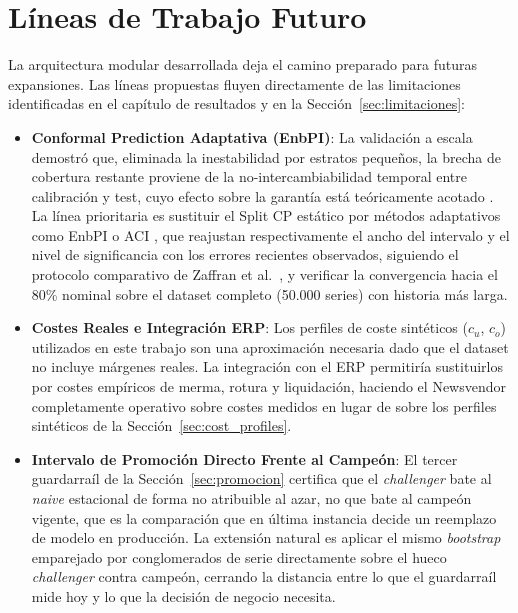 \section{Líneas de Trabajo Futuro}
\label{sec:trabajo_futuro}
La arquitectura modular desarrollada deja el camino preparado para futuras expansiones. Las líneas propuestas fluyen directamente de las limitaciones identificadas en el capítulo de resultados y en la Sección~\ref{sec:limitaciones}:

\begin{itemize}
    \item \textbf{Conformal Prediction Adaptativa (EnbPI)}: La validación a escala demostró que,
    eliminada la inestabilidad por estratos pequeños, la brecha de cobertura restante proviene de la
    no-intercambiabilidad temporal entre calibración y test, cuyo efecto sobre la garantía está
    teóricamente acotado \cite{barber2023beyond}. La línea prioritaria es sustituir el
    Split CP estático por métodos adaptativos como EnbPI \cite{xu2021conformal} o ACI
    \cite{gibbs2021adaptive}, que reajustan respectivamente el ancho del intervalo y el nivel de
    significancia con los errores recientes observados, siguiendo el protocolo comparativo de
    Zaffran et al.\ \cite{zaffran2022adaptive}, y verificar la convergencia hacia el
    80\% nominal sobre el dataset completo (50.000 series) con historia más larga.

    \item \textbf{Costes Reales e Integración ERP}: Los perfiles de coste sintéticos ($c_u$, $c_o$)
    utilizados en este trabajo son una aproximación necesaria dado que el dataset no incluye
    márgenes reales. La integración con el ERP permitiría sustituirlos por costes empíricos de
    merma, rotura y liquidación, haciendo el Newsvendor completamente operativo sobre costes
    medidos en lugar de sobre los perfiles sintéticos de la Sección~\ref{sec:cost_profiles}.

    \item \textbf{Intervalo de Promoción Directo Frente al Campeón}: El tercer guardarraíl
    de la Sección~\ref{sec:promocion} certifica que el \textit{challenger} bate al \textit{naive}
    estacional de forma no atribuible al azar, no que bate al campeón vigente, que es la
    comparación que en última instancia decide un reemplazo de modelo en producción. La
    extensión natural es aplicar el mismo \textit{bootstrap} emparejado por conglomerados de
    serie directamente sobre el hueco \textit{challenger} contra campeón, cerrando la distancia
    entre lo que el guardarraíl mide hoy y lo que la decisión de negocio necesita.


\end{itemize}

